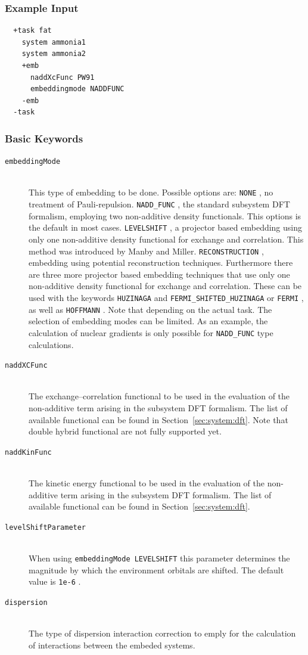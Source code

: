 \documentclass[bibliography=totocnumbered,a4paper,10pt,oneside]{scrbook}
\newcommand{\ttt}[1]{%
  \begingroup\setlength{\fboxsep}{1pt}%
  \colorbox{serenity-green!30}{\texttt{\hspace*{2pt}\vphantom{(g}#1\hspace*{2pt}}}%
  \endgroup
}
\begin{document}
\subsubsection{Example Input}
\begin{lstlisting}
  +task fat
    system ammonia1
    system ammonia2
    +emb
      naddXcFunc PW91
      embeddingmode NADDFUNC
    -emb
  -task
\end{lstlisting}
\subsubsection{Basic Keywords}
\begin{description}
  \item [\texttt{embeddingMode}]\hfill \\
    This type of embedding to be done. Possible options are:
    \ttt{NONE}, no treatment of Pauli-repulsion.
    \ttt{NADD\_FUNC}, the standard subsystem DFT formalism, employing two non-additive density functionals.
    This options is the default in most cases.
    \ttt{LEVELSHIFT}, a projector based embedding using only one non-additive density functional for exchange
    and correlation. This method was introduced by Manby and Miller.
    \ttt{RECONSTRUCTION}, embedding using potential reconstruction techniques.
    Furthermore there are three more projector based embedding techniques that use only one non-additive
    density functional for exchange and correlation. These can be used with the keywords \ttt{HUZINAGA} and
    \ttt{FERMI\_SHIFTED\_HUZINAGA} or \ttt{FERMI}, as well as \ttt{HOFFMANN}.
    Note that depending on the actual task. The selection of embedding modes can be limited. As an example,
    the calculation of nuclear gradients is only possible for \ttt{NADD\_FUNC} type calculations.
  \item [\texttt{naddXCFunc}]\hfill \\
    The exchange--correlation functional to be used in the evaluation of the non-additive term arising in the
    subsystem DFT formalism. The list of available functional can be found in Section~\ref{sec:system:dft}.
    Note that double hybrid functional are not fully supported yet. 
  \item [\texttt{naddKinFunc}]\hfill \\
    The kinetic energy functional to be used in the evaluation of the non-additive term arising in the
    subsystem DFT formalism. The list of available functional can be found in Section~\ref{sec:system:dft}.
  \item [\texttt{levelShiftParameter}]\hfill \\
    When using \ttt{embeddingMode LEVELSHIFT} this parameter determines the magnitude by which the environment
    orbitals are shifted. The default value is \ttt{1e-6}.
  \item [\texttt{dispersion}]\hfill \\
    The type of dispersion interaction correction to emply for the calculation of interactions between the
    embeded systems.
\end{description}
\end{document}
